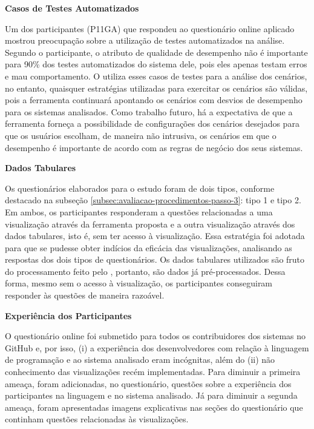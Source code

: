 \noindent \textbf{Casos de Testes Automatizados} \label{subsec:avaliacao-consideracoes-testes-unitarios}

Um dos participantes (P11GA) que respondeu ao questionário online aplicado mostrou preocupação sobre a utilização de testes automatizados na análise. Segundo o participante, o atributo de qualidade de desempenho não é importante para 90\% dos testes automatizados do sistema dele, pois eles apenas testam erros e mau comportamento. O \textit{\perfMinerName} utiliza esses casos de testes para a análise dos cenários, no entanto, quaisquer estratégias utilizadas para exercitar os cenários são válidas, pois a ferramenta continuará apontando os cenários com desvios de desempenho para os sistemas analisados. Como trabalho futuro, há a expectativa de que a ferramenta forneça a possibilidade de configurações dos cenários desejados para que os usuários escolham, de maneira não intrusiva, os cenários em que o desempenho é importante de acordo com as regras de negócio dos seus sistemas.

\noindent \textbf{Dados Tabulares}

Os questionários elaborados para o estudo foram de dois tipos, conforme destacado na subseção \ref{subsec:avaliacao-procedimentos-passo-3}: tipo 1 e tipo 2. Em ambos, os participantes responderam a questões relacionadas a uma visualização através da ferramenta proposta e a outra visualização através dos dados tabulares, isto é, sem ter acesso à visualização. Essa estratégia foi adotada para que se pudesse obter indícios da eficácia das visualizações, analisando as respostas dos dois tipos de questionários. Os dados tabulares utilizados são fruto do processamento feito pelo \textit{\perfMinerName}, portanto, são dados já pré-processados. Dessa forma, mesmo sem o acesso à visualização, os participantes conseguiram responder às questões de maneira razoável.

\hfill

\noindent \textbf{Experiência dos Participantes}

O questionário online foi submetido para todos os contribuidores dos sistemas no GitHub e, por isso, (i) a experiência dos desenvolvedores com relação à linguagem de programação e ao sistema analisado eram incógnitas, além do (ii) não conhecimento das visualizações recém implementadas. Para diminuir a primeira ameaça, foram adicionadas, no questionário, questões sobre a experiência dos participantes na linguagem e no sistema analisado. Já para diminuir a segunda ameaça, foram apresentadas imagens explicativas nas seções do questionário que continham questões relacionadas às visualizações.


